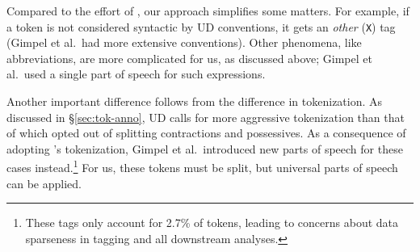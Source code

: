 \documentclass[11pt,a4paper]{article}
\begin{document}
Compared to the effort of
, our approach simplifies some
matters.  For example, if a token is not considered syntactic by UD
conventions, it gets an \emph{other} (\texttt{X}) tag (Gimpel et
al.~had more extensive conventions).  Other phenomena, like
abbreviations, are more complicated for us, as discussed above;
Gimpel et al.~used a single part of speech for such expressions.


Another important difference follows from the difference in
tokenization.  As discussed in \S\ref{sec:tok-anno}, UD calls for more
aggressive tokenization than that of \citet{ICWSM101540} which opted
out of splitting contractions and possessives. As a consequence of adopting \citet{ICWSM101540}'s tokenization, 
Gimpel et al.~introduced new parts of speech for these cases
instead.\footnote{These tags only account for 2.7\% of tokens,
  leading to concerns about data sparseness in tagging and all
  downstream analyses.}  For us, these tokens must be split, but
universal parts of speech can be applied.
\end{document}
